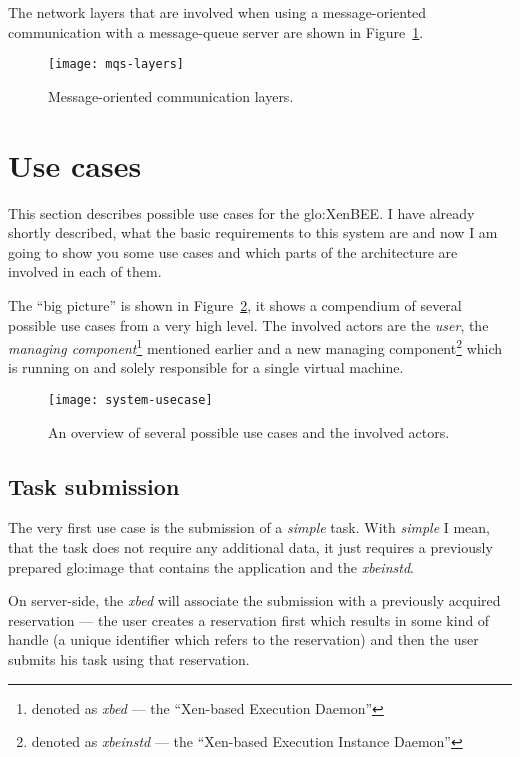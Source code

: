 The  network  layers  that  are  involved when  using  a  message-oriented
communication    with    a    message-queue    server   are    shown    in
Figure~\ref{fig:mqs-layers}.

\begin{figure}[htbp]
  \centering
  \texttt{[image: mqs-layers]}
  \caption[Message Layers]{Message-oriented communication layers.}
  \label{fig:mqs-layers}
\end{figure}


\section{Use cases}
\label{sec:use-cases}

This section describes possible use cases for the \gls{glo:XenBEE}. I have
already shortly described, what the  basic requirements to this system are
and now  I am  going to show  you some  use cases and  which parts  of the
architecture are involved in each of them.

The ``big picture'' is shown in Figure~\ref{fig:system-usecases}, it shows
a compendium  of several possible  use cases from  a very high  level. The
involved    actors    are     the    \emph{user},    the    \emph{managing
  component}\footnote{denoted as \emph{xbed} --- the ``Xen-based Execution
  Daemon''}     mentioned      earlier     and     a      new     managing
component\footnote{denoted   as   \emph{xbeinstd}   ---  the   ``Xen-based
  Execution Instance Daemon''} which  is running on and solely responsible
for a single virtual machine.

\begin{figure}[htbp]
  \centering
  \texttt{[image: system-usecase]}
  \caption[Use case  overview]{An overview  of several possible  use cases
    and the involved actors.}
  \label{fig:system-usecases}
\end{figure}

\subsection{Task submission}
\label{sec:uc-task-submission}

The very  first use case is  the submission of a  \emph{simple} task. With
\emph{simple} I mean, that the  task does not require any additional data,
it just  requires a previously prepared \gls{glo:image}  that contains the
application and the \emph{xbeinstd}.

On  server-side, the  \emph{xbed}  will associate  the  submission with  a
previously acquired  reservation ---  \ie the user creates  a reservation
first  which results in  some kind  of handle  (a unique  identifier which
refers to the  reservation) and then the user submits  his task using that
reservation.


